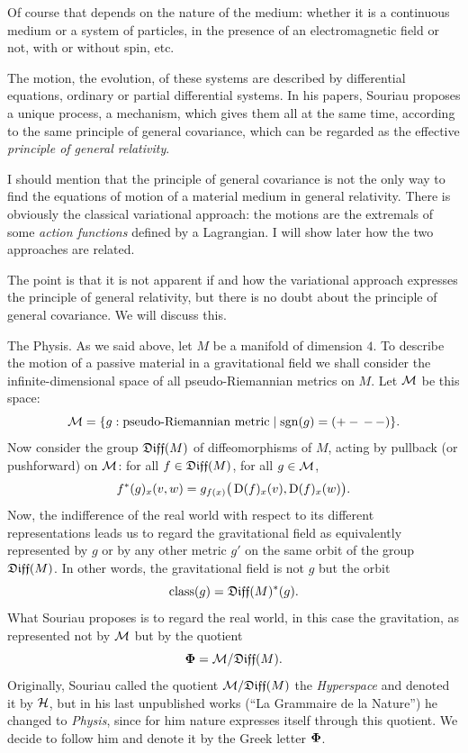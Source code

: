 Of course that depends on the nature of the medium:
whether it is a continuous medium or a system of particles,
in the presence of an electromagnetic field or not,
with or without spin, etc.

The motion,
the evolution,
of these systems are described by differential equations,
ordinary or partial differential systems.
In his papers,
Souriau proposes a unique process,
a mechanism,
which gives them all at the same time,
according to the same principle of general covariance,
which can be regarded as the effective \emph{principle of general relativity}.

I should mention that the principle of general covariance is not the only way to find the equations of motion of a material medium in general relativity.
There is obviously the classical variational approach:
the motions are the extremals of some \emph{action functions} defined by a Lagrangian.
I will show later how the two approaches are related.

The point is that it is not apparent if and how the variational approach expresses the principle of general relativity,
but there is no doubt about the principle of general covariance.
We will discuss this.

\begin{Article}{The Physis.}{}
  As we said above,
  let $M$ be a manifold of dimension $4$.
  To describe the motion of a passive material in a gravitational field we shall consider the infinite-dimensional space of all pseudo-Riemannian metrics on $M$.
  Let $\mathcal{M}$ be this space:
  $$
    \mathcal{M} = \{ g : \text{pseudo-Riemannian metric} \mid \operatorname{sgn}(g) = (+ -\, -\, -)\}.
  $$
  Now consider the group $\mathfrak{Diff}(M)$ of diffeomorphisms of $M$,
  acting by pullback (or pushforward) on $\mathcal{M}$:
  for all $f \in \mathfrak{Diff}(M)$,
  for all $g \in \mathcal{M}$,
  $$
    f^*(g)_x(v,w) = g_{f(x)}\big(\operatorname{D}(f)_x(v),\operatorname{D}(f)_x(w)\big).
  $$
  Now,
  the indifference of the real world with respect to its different representations leads us to regard the gravitational field as equivalently represented by $g$ or by any other metric $g'$ on the same orbit of the group $\mathfrak{Diff}(M)$.
  In other words,
  the gravitational field is not $g$ but the orbit
  $$
    \operatorname{class}(g) = \mathfrak{Diff}(M)^*(g).
  $$
  What Souriau proposes is to regard the real world,
  in this case the gravitation,
  as represented not by $\mathcal{M}$ but by the quotient
  $$
    {\mbox{\boldmath $\Phi$}} = \mathcal{M}/\mathfrak{Diff}(M).
  $$
  Originally,
  Souriau called the quotient $\mathcal{M}/\mathfrak{Diff}(M)$ the \emph{Hyperspace} and denoted it by $\mathcal{H}$,
  but in his last unpublished works (``La Grammaire de la Nature'') he changed to \emph{Physis},
  since for him nature expresses itself through this quotient.
  We decide to follow him and denote it by the Greek letter ${\mbox{\boldmath $\Phi$}}$.
\end{Article}

